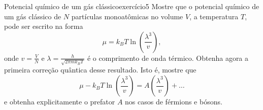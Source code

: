 \begin{exercício}{Potencial químico de um gás clássico}{exercício5}
    Mostre que o potencial químico de um gás clássico de \(N\) partículas monoatômicas no volume \(V\), a temperatura \(T\), pode ser escrito na forma
    \begin{equation*}
        \mu = k_B T \ln\left(\frac{\lambda^3}{v}\right),
    \end{equation*}
    onde \(v = \frac{V}{N}\) e \(\lambda = \frac{h}{\sqrt{2 \pi mk_B T}}\) é o comprimento de onda térmico. Obtenha agora a primeira correção quântica desse resultado. Isto é, mostre que
    \begin{equation*}
        \mu - k_BT \ln\left(\frac{\lambda^3}{v}\right) = A\left(\frac{\lambda^3}{v}\right) + \dots
    \end{equation*}
    e obtenha explicitamente o prefator \(A\) nos casos de férmions e bósons.
\end{exercício}
